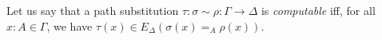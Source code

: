 Let us say that a path substitution $\tau : \sigma \sim \rho : \Gamma \rightarrow \Delta$ is
\emph{computable} iff, for all $x : A \in \Gamma$, we have $\tau(x) \in E_\Delta(\sigma(x) =_A \rho(x))$.

\begin{code}%
\> \AgdaSymbol{:}  \AgdaSymbol{\{}\AgdaSymbol{\}} \AgdaSymbol{\{}\AgdaSymbol{\}}                    \<%
\\
\>         \AgdaSymbol{=}      \AgdaSymbol{(} \AgdaSymbol{\_}        \AgdaSymbol{\_} \AgdaSymbol{)} \AgdaSymbol{(} \AgdaSymbol{)}\<%
\end{code}


